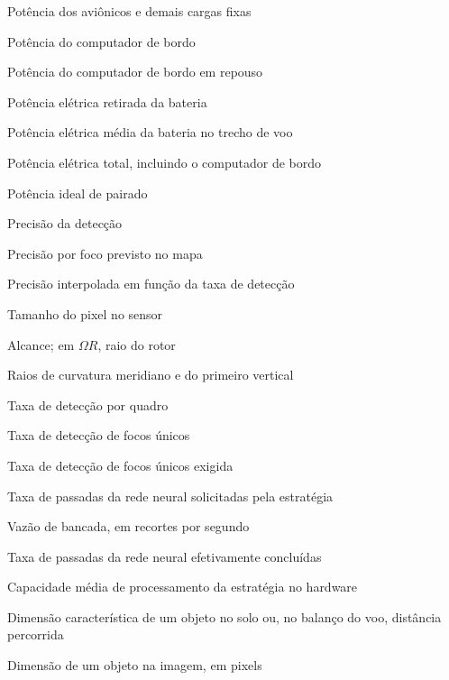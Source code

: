 \begin{simbolos}
  \item[$P_{av}$]                  Potência dos aviônicos e demais cargas fixas
  \item[$P_c$]                     Potência do computador de bordo
  \item[$P_{c0}$]                  Potência do computador de bordo em repouso
  \item[$P_{el}$]                  Potência elétrica retirada da bateria
  \item[$\bar{P}_{el}$] Potência elétrica média da bateria no trecho de voo
  \item[$P_{el,\mathrm{tot}}$]     Potência elétrica total, incluindo o computador de bordo
  \item[$P_{h,\mathrm{ideal}}$]     Potência ideal de pairado
  \item[$\mathcal{P}$]             Precisão da detecção
  \item[$\mathcal{P}_f$] Precisão por foco previsto no mapa
  \item[$\mathcal{P}_{\mathrm{interp}}$] Precisão interpolada em função da taxa de detecção
  \item[$p$]                       Tamanho do pixel no sensor
  \item[$R$]                       Alcance; em $\Omega R$, raio do rotor
  \item[$R_M, R_N$]                Raios de curvatura meridiano e do primeiro vertical
  \item[$\mathcal{R}$]             Taxa de detecção por quadro
  \item[$\mathcal{R}_f$]           Taxa de detecção de focos únicos
  \item[$\mathcal{R}_{\min}$]      Taxa de detecção de focos únicos exigida
  \item[$r$]                       Taxa de passadas da rede neural solicitadas pela estratégia
  \item[$r_b$]                     Vazão de bancada, em recortes por segundo
  \item[$r_{\mathrm{exec}}$]       Taxa de passadas da rede neural efetivamente concluídas
  \item[$r_{\max}$]                Capacidade média de processamento da estratégia no hardware
  \item[$s$]                       Dimensão característica de um objeto no solo ou, no balanço do voo, distância percorrida
  \item[$s_{px}$]                  Dimensão de um objeto na imagem, em pixels

\end{simbolos}

